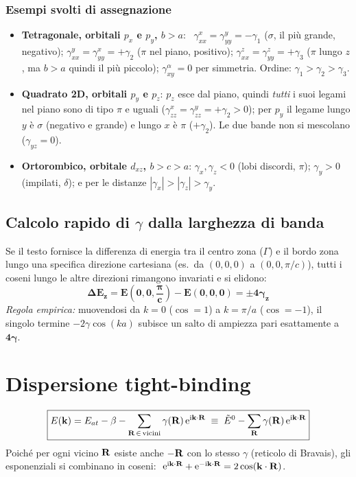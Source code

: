 \subsubsection*{Esempi svolti di assegnazione}
\begin{itemize}
\item \textbf{Tetragonale, orbitali $p_x$ e $p_y$, $b>a$}: \
$\gamma^x_{xx}=\gamma^y_{yy}=-\gamma_1$ ($\sigma$, il più grande, negativo);
$\gamma^y_{xx}=\gamma^x_{yy}=+\gamma_2$ ($\pi$ nel piano, positivo);
$\gamma^z_{xx}=\gamma^z_{yy}=+\gamma_3$ ($\pi$ lungo $z$, ma $b>a$ quindi il più piccolo);
$\gamma_{xy}^\alpha = 0$ per simmetria. Ordine: $\gamma_1>\gamma_2>\gamma_3$.
\item \textbf{Quadrato 2D, orbitali $p_y$ e $p_z$}: $p_z$ esce dal piano, quindi \emph{tutti} i suoi legami nel piano sono di tipo $\pi$ e uguali ($\gamma^x_{zz}=\gamma^y_{zz}=+\gamma_2>0$); per $p_y$ il legame lungo $y$ è $\sigma$ (negativo e grande) e lungo $x$ è $\pi$ ($+\gamma_2$). Le due bande non si mescolano ($\gamma_{yz}=0$).
\item \textbf{Ortorombico, orbitale $d_{xz}$, $b>c>a$}: $\gamma_x,\gamma_z<0$ (lobi discordi, $\pi$); $\gamma_y>0$ (impilati, $\delta$); e per le distanze $|\gamma_x|>|\gamma_z|>\gamma_y$.
\end{itemize}

\subsection{Calcolo rapido di $\gamma$ dalla larghezza di banda}
Se il testo fornisce la differenza di energia tra il centro zona ($\Gamma$) e il bordo zona lungo una specifica direzione cartesiana (es.\ da $(0,0,0)$ a $(0,0,\pi/c)$), tutti i coseni lungo le altre direzioni rimangono invariati e si elidono:
\[ \bm{\Delta E_z = E\!\left(0,0,\frac{\pi}{c}\right) - E(0,0,0) = \pm 4\gamma_z} \]
\textit{Regola empirica:} muovendosi da $k=0$ ($\cos=1$) a $k=\pi/a$ ($\cos=-1$), il singolo termine $-2\gamma\cos(ka)$ subisce un salto di ampiezza pari esattamente a $\mathbf{4\gamma}$.

\newpage
\section{Dispersione tight-binding}

\[ \boxed{E(\mathbf{k}) = E_{at} - \beta - \sum_{\mathbf{R}\,\in\,\text{vicini}} \gamma(\mathbf{R})\,\mathrm{e}^{\mathrm{i}\mathbf{k}\cdot\mathbf{R}}
   \;\equiv\; \tilde E^0 - \sum_{\mathbf{R}}\gamma(\mathbf{R})\,\mathrm{e}^{\mathrm{i}\mathbf{k}\cdot\mathbf{R}}} \]
Poiché per ogni vicino $\mathbf{R}$ esiste anche $-\mathbf{R}$ con lo stesso $\gamma$ (reticolo di Bravais), gli esponenziali si combinano in coseni:
$\ \ee^{\ii\kvec\cdot\Rvec}+\ee^{-\ii\kvec\cdot\Rvec} = 2\cos(\kvec\cdot\Rvec)$.

